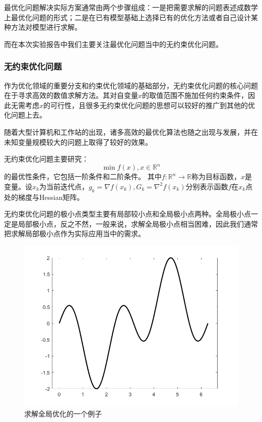 最优化问题解决实际方案通常由两个步骤组成：一是把需要求解的问题表述成数学上最优化问题的形式；二是在已有模型基础上选择已有的优化方法或者自己设计某种方法对模型进行求解\cite{杨庆之2015最优化方法}。

而在本次实验报告中我们主要关注最优化问题当中的无约束优化问题。

 \subsubsection{无约束优化问题}

作为优化领域的重要分支和约束优化领域的基础部分，无约束优化问题的核心问题在于寻求高效的数值求解方法。其对自变量$ x $的取值范围不施加任何约束条件，因此无需考虑$ x $的可行性，且很多无约束优化问题的思想可以较好的推广到其他的优化问题上去。

随着大型计算机和工作站的出现，诸多高效的最优化算法也随之出现与发展，并在未知变量规模较大的问题上取得了较好的效果。

无约束优化问题主要研究：
\begin{equation}\label{min}
	\min f(x) ,x \in \mathbb{R}^{n}
\end{equation}
的最优性条件，它包括一阶条件和二阶条件。
其中$ f: \mathbb{R}^{n} \rightarrow \mathbb{R} $称为目标函数，$ x $是变量。设$ x_{k} $为当前迭代点，$ g_{k}=\nabla f(x_{k}), G_{k}=\nabla^{2}f(x_{k})$分别表示函数$ f $在$ x_{k} $点处的梯度与Hessian矩阵。

无约束优化问题的极小点类型主要有局部较小点和全局极小点两种。全局极小点一定是局部极小点，反之不然，一般来说，求解全局极小点相当困难，因此我们通常把求解局部极小点作为实际应用当中的需求。
\begin{figure}[t]
	\centering
	\includegraphics[scale=0.4]{figures/极小值.png}
	\caption{求解全局优化的一个例子}
\end{figure}

